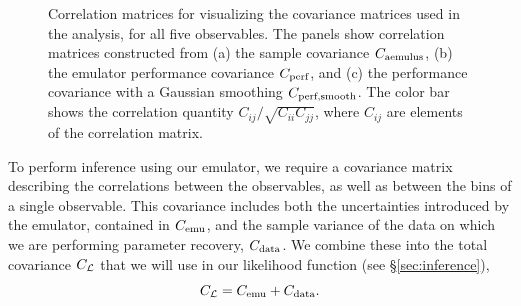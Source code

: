 \begin{figure}%
\centering
{}
\caption{Correlation matrices for visualizing the covariance matrices used in the analysis, for all five observables. The panels show correlation matrices constructed from (a) the \aemulus sample covariance $C_\text{aemulus}$, (b) the emulator performance covariance $C_\text{perf}$, and (c) the performance covariance with a Gaussian smoothing $C_\text{perf,smooth}$. The color bar shows the correlation quantity $C_{ij}/\sqrt{C_{ii}C_{jj}}$, where $C_{ij}$ are elements of the correlation matrix.}
\label{fig:covs}
\end{figure}

To perform inference using our emulator, we require a covariance matrix describing the correlations between the observables, as well as between the bins of a single observable.
This covariance includes both the uncertainties introduced by the emulator, contained in $C_\text{emu}$, and the sample variance of the data on which we are performing parameter recovery, $C_\text{data}$.
We combine these into the total covariance $C_{\mathcal{L}}$ that we will use in our likelihood function (see \S\ref{sec:inference}),
\begin{equation}
    C_{\mathcal{L}} = C_\text{emu} + C_\text{data}.
\end{equation}

